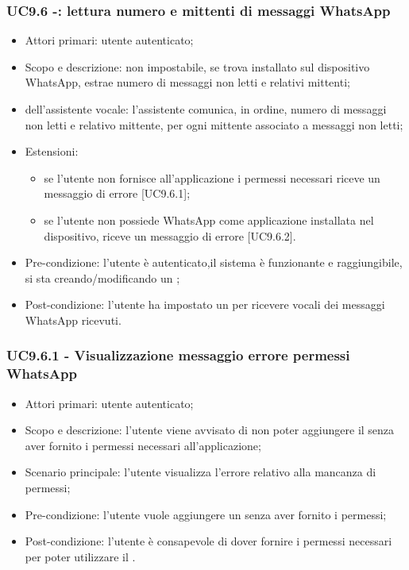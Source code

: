 \subsubsection{UC9.6 -: lettura numero e mittenti di messaggi WhatsApp}
\begin{itemize}
	\item  Attori primari: utente autenticato;
	\item  Scopo e descrizione:  non impostabile, se trova installato sul dispositivo WhatsApp, estrae numero di messaggi non letti e relativi mittenti;
	\item  {} dell'assistente vocale: l'assistente comunica, in ordine, numero di messaggi non letti e relativo mittente, per ogni mittente associato a messaggi non letti;
	\item  Estensioni:
		   \begin{itemize}
				\item se l'utente non fornisce all'applicazione i permessi necessari riceve un messaggio di errore [UC9.6.1];
				\item se l'utente non possiede WhatsApp come applicazione installata nel dispositivo, riceve un messaggio di errore [UC9.6.2].
		   \end{itemize}
	\item  Pre-condizione: l'utente è autenticato,il sistema è funzionante e raggiungibile, si sta creando/modificando un ;
	\item  Post-condizione: l'utente ha impostato un  per ricevere  vocali dei messaggi WhatsApp ricevuti.
\end{itemize}
\subsubsection{UC9.6.1 - Visualizzazione messaggio errore permessi WhatsApp}
\begin{itemize}
	\item  Attori primari: utente autenticato;
	\item  Scopo e descrizione: l'utente viene avvisato di non poter aggiungere il  senza aver fornito i permessi necessari all'applicazione;
	\item  Scenario principale: l'utente visualizza l'errore relativo alla mancanza di permessi;
	\item  Pre-condizione: l'utente vuole aggiungere un  senza aver fornito i permessi;
	\item  Post-condizione: l'utente è consapevole di dover fornire i permessi necessari per poter utilizzare il .
\end{itemize}
